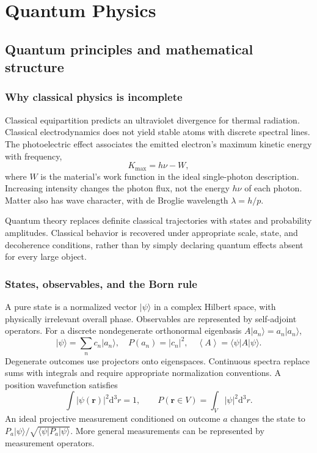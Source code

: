 \documentclass[11pt,oneside]{book}
\newcommand{\dd}{\mathrm{d}}
\newcommand{\vect}[1]{\boldsymbol{#1}}
\newcommand{\avg}[1]{\left\langle #1\right\rangle}
\newcommand{\ket}[1]{\lvert #1\rangle}
\newcommand{\bra}[1]{\langle #1\rvert}
\theoremstyle{reviewstyle}
\begin{document}
\part{Quantum Physics}
\chapter{Quantum principles and mathematical structure}
\section{Why classical physics is incomplete}
Classical equipartition predicts an ultraviolet divergence for thermal radiation. Classical electrodynamics does not yield stable atoms with discrete spectral lines. The photoelectric effect associates the emitted electron's maximum kinetic energy with frequency,
\begin{equation}K_{\max}=h\nu-W,\end{equation}
where $W$ is the material's work function in the ideal single-photon description. Increasing intensity changes the photon flux, not the energy $h\nu$ of each photon. Matter also has wave character, with de Broglie wavelength $\lambda=h/p$.

Quantum theory replaces definite classical trajectories with states and probability amplitudes. Classical behavior is recovered under appropriate scale, state, and decoherence conditions, rather than by simply declaring quantum effects absent for every large object.
\section{States, observables, and the Born rule}
A pure state is a normalized vector $\ket\psi$ in a complex Hilbert space, with physically irrelevant overall phase. Observables are represented by self-adjoint operators. For a discrete nondegenerate orthonormal eigenbasis $A\ket{a_n}=a_n\ket{a_n}$,
\begin{equation}
\ket\psi=\sum_n c_n\ket{a_n},\quad
P(a_n)=|c_n|^2,\quad \avg A=\bra\psi A\ket\psi.
\end{equation}
Degenerate outcomes use projectors onto eigenspaces. Continuous spectra replace sums with integrals and require appropriate normalization conventions. A position wavefunction satisfies
\begin{equation}\int|\psi(\vect r)|^2\dd^3r=1,\qquad P(\vect r\in V)=\int_V|\psi|^2\dd^3r.\end{equation}
An ideal projective measurement conditioned on outcome $a$ changes the state to $P_a\ket\psi/\sqrt{\bra\psi P_a\ket\psi}$. More general measurements can be represented by measurement operators.
\end{document}
